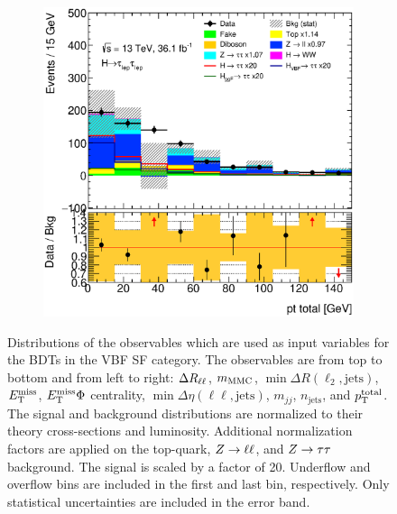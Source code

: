 \begin{figure}[htb]
\begin{subfigure}[t]{0.3\textwidth}
    \end{subfigure}
    \begin{subfigure}[t]{0.3\textwidth}
        \includegraphics[width=\textwidth]{./plots/mva/modeling/input_vars/VBF_SF/ll-CutMVAVBFCatSF-PtTotal-lin.eps}
    \end{subfigure}
    \caption{Distributions of the observables which are used as input variables for the BDTs in the VBF SF category.
             The observables are from top to bottom and from left to right: $\Delta R_{\ell\ell}$, $m_\text{MMC}$, $\min \Delta R (\ell_2, \text{jets})$,
             $E_\text{T}^\text{miss}$, $E_\text{T}^\text{miss} \Phi$ centrality, $\min \Delta \eta (\ell\ell, \text{jets})$, $m_{jj}$, $n_\text{jets}$, and $p_\text{T}^\text{total}$.
             The signal and background distributions are normalized to their theory cross-sections and luminosity.
             Additional normalization factors are applied on the top-quark, $Z \to \ell \ell$, and $Z \to \tau \tau$ background.
             The signal is scaled by a factor of 20.
             Underflow and overflow bins are included in the first and last bin, respectively.
             Only statistical uncertainties are included in the error band.}\label{fig:mva:modeling:sr:vbfsf}
\end{figure}

